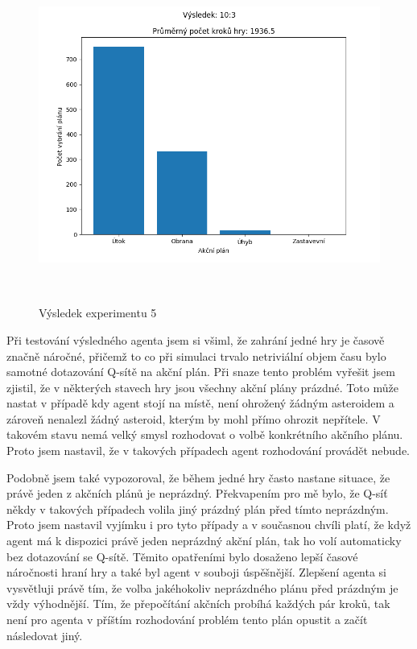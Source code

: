 \begin{figure}[H]\centering
    \includegraphics[width=145mm, height=110mm]{./Obrazky/Experiment05Results.png}
    \caption{Výsledek experimentu 5}
    \label{Průběh trénování experimentu 05}
    \end{figure}



Při testování výsledného agenta jsem si všiml, že zahrání jedné hry je časově značně náročné, přičemž to co při simulaci trvalo netriviální objem času bylo samotné dotazování Q-sítě na akční plán.
Při snaze tento problém vyřešit jsem zjistil, že v některých stavech hry jsou všechny akční plány prázdné. 
Toto může nastat v případě kdy agent stojí na místě, není ohrožený žádným asteroidem a zároveň nenalezl žádný asteroid, kterým by mohl přímo ohrozit nepřítele.
V takovém stavu nemá velký smysl rozhodovat o volbě konkrétního akčního plánu. Proto jsem nastavil, že v takových případech agent rozhodování provádět nebude.

Podobně jsem také vypozoroval, že během jedné hry často nastane situace, že právě jeden z akčních plánů je neprázdný. Překvapením pro mě bylo, že Q-síť někdy v takových případech volila jiný prázdný plán před tímto neprázdným.
Proto jsem nastavil vyjímku i pro tyto případy a v současnou chvíli platí, že když agent má k dispozici právě jeden neprázdný akční plán, tak ho volí automaticky bez dotazování se Q-sítě.
Těmito opatřeními bylo dosaženo lepší časové náročnosti hraní hry a také byl agent v souboji úspěšnější. 
Zlepšení agenta si vysvětluji právě tím, že volba jakéhokoliv neprázdného plánu před prázdným je vždy výhodnější.
Tím, že přepočítání akčních probíhá každých pár kroků, tak není pro agenta v příštím rozhodování problém tento plán opustit a začít následovat jiný.

